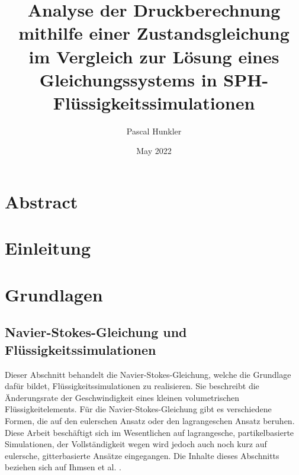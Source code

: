 \documentclass{scrreprt}
\title{Analyse der Druckberechnung mithilfe einer Zustandsgleichung im Vergleich zur Lösung eines Gleichungssystems in SPH- Flüssigkeitssimulationen}
\author{Pascal Hunkler}
\date{May 2022}
\begin{document}
\maketitle

\setlength{\parindent}{0pt}
\setlength{\parskip}{1em}

\tableofcontents

\chapter{Abstract}
\chapter{Einleitung}
\chapter{Grundlagen}
\section{Navier-Stokes-Gleichung und Flüssigkeitssimulationen}
Dieser Abschnitt behandelt die Navier-Stokes-Gleichung, welche die Grundlage dafür bildet, Flüssigkeitssimulationen zu realisieren.
Sie beschreibt die Änderungsrate der Geschwindigkeit eines kleinen volumetrischen Flüssigkeitelements.
Für die Navier-Stokes-Gleichung gibt es verschiedene Formen, die auf den eulerschen Ansatz oder den lagrangeschen Ansatz beruhen.
Diese Arbeit beschäftigt sich im Wesentlichen auf lagrangesche, partikelbasierte Simulationen,
der Vollständigkeit wegen wird jedoch auch noch kurz auf eulersche, gitterbasierte Ansätze eingegangen.
Die Inhalte dieses Abschnitts beziehen sich auf Ihmsen et al. \cite{ihmsen_sph_2014}.
\end{document}
